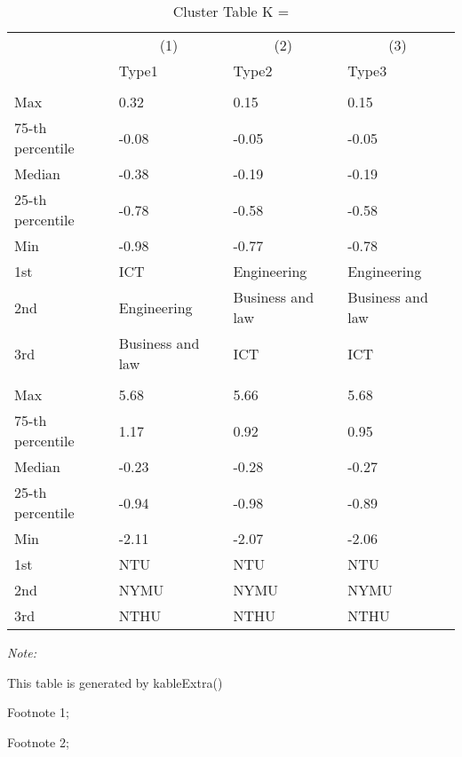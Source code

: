 \begin{table}
\centering
\caption{Cluster Table K = }
\centering
\begin{threeparttable}
\begin{tabular}[t]{llll}
\toprule
\multicolumn{1}{c}{ } & \multicolumn{1}{c}{(1)} & \multicolumn{1}{c}{(2)} & \multicolumn{1}{c}{(3)} \\
\cmidrule(l{3pt}r{3pt}){2-2} \cmidrule(l{3pt}r{3pt}){3-3} \cmidrule(l{3pt}r{3pt}){4-4}
 & Type1 & Type2 & Type3\\
\midrule
\addlinespace[0.3em]
\multicolumn{4}{l}{\textit{\textbf{Panel A: }}}\\
\hspace{1em}Max & 0.32 & 0.15 & 0.15\\
\hspace{1em}75-th percentile & -0.08 & -0.05 & -0.05\\
\hspace{1em}Median & -0.38 & -0.19 & -0.19\\
\hspace{1em}25-th percentile & -0.78 & -0.58 & -0.58\\
\hspace{1em}Min & -0.98 & -0.77 & -0.78\\
\hspace{1em}1st & ICT & Engineering & Engineering\\
\hspace{1em}2nd & Engineering & Business and law & Business and law\\
\hspace{1em}3rd & Business and law & ICT & ICT\\
\addlinespace[0.3em]
\multicolumn{4}{l}{\textit{\textbf{Panel B: }}}\\
\hspace{1em}Max & 5.68 & 5.66 & 5.68\\
\hspace{1em}75-th percentile & 1.17 & 0.92 & 0.95\\
\hspace{1em}Median & -0.23 & -0.28 & -0.27\\
\hspace{1em}25-th percentile & -0.94 & -0.98 & -0.89\\
\hspace{1em}Min & -2.11 & -2.07 & -2.06\\
\hspace{1em}1st & NTU & NTU & NTU\\
\hspace{1em}2nd & NYMU & NYMU & NYMU\\
\hspace{1em}3rd & NTHU & NTHU & NTHU\\
\bottomrule
\end{tabular}
\begin{tablenotes}
\item \textit{Note: } 
\item This table is generated by kableExtra()
\item[1] Footnote 1; 
\item[2] Footnote 2; 
\end{tablenotes}
\end{threeparttable}
\end{table}
